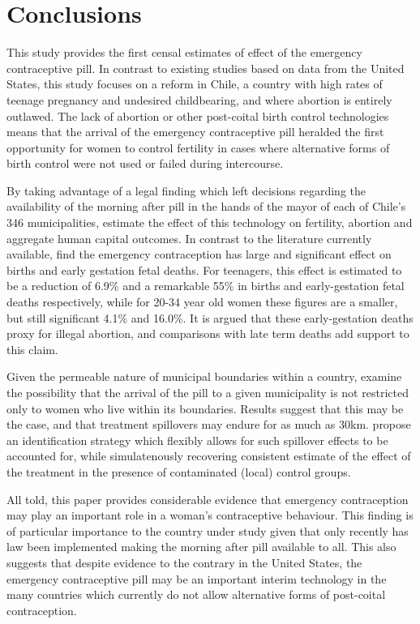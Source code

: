 \section{Conclusions}
\label{TEENscn:conclusion}
This study provides the first censal estimates of effect of the emergency
contraceptive pill.  In contrast to existing studies based on data from the 
United States, this study focuses on a reform in Chile, a country with high rates
of teenage pregnancy and undesired childbearing, and where abortion is entirely 
outlawed.  The lack of abortion or other post-coital birth control technologies 
means that the arrival of the emergency contraceptive pill heralded the first 
opportunity for women to control fertility in cases where alternative forms of 
birth control were not used or failed during intercourse.

By taking advantage of a legal finding which left decisions regarding the 
availability of the morning after pill in the hands of the mayor of each of
Chile's 346 municipalities, \person estimate the effect of this technology on 
fertility, abortion and aggregate human capital outcomes. In contrast to the 
literature currently available, \person find the emergency contraception has 
large and significant effect on births and early gestation fetal deaths.  For 
teenagers, this effect is estimated to be a reduction of 6.9\% and a remarkable 
55\% in births and early-gestation fetal deaths respectively, while for 20-34 
year old women these figures are a smaller, but still significant 4.1\% and 
16.0\%.  It is argued that these early-gestation deaths proxy for illegal 
abortion, and comparisons with late term deaths add support to this claim.

Given the permeable nature of municipal boundaries within a country, \person 
examine the possibility that the arrival of the pill to a given municipality
is not restricted only to women who live within its boundaries.  Results
suggest that this may be the case, and that treatment spillovers may endure 
for as much as 30km. \Person propose an identification strategy which flexibly 
allows for such spillover effects to be accounted for, while simulatenously 
recovering consistent estimate of the effect of the treatment in the presence 
of contaminated (local) control groups.

All told, this paper provides considerable evidence that emergency contraception 
may play an important role in a woman's contraceptive behaviour.  This finding
is of particular importance to the country under study given that only recently
has law been implemented making the morning after pill available to all.  This
also suggests that despite evidence to the contrary in the United States, the 
emergency contraceptive pill may be an important interim technology in the many 
countries which currently do not allow alternative forms of post-coital 
contraception.

